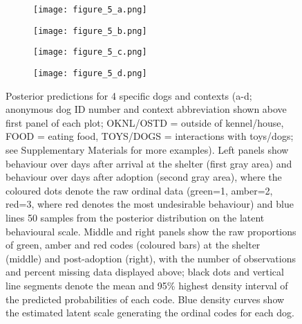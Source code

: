 \documentclass[12pt]{article}
\begin{document}
\begin{figure}[t!]
  \centering
  \begin{subfigure}{1\textwidth}
    \centering
    \texttt{[image: figure\_5\_a.png]}
  \end{subfigure}
  \begin{subfigure}{1\textwidth}
    \centering
    \vspace{-0.6cm}
    \texttt{[image: figure\_5\_b.png]}
  \end{subfigure}
  \begin{subfigure}{1\textwidth}
    \centering
    \vspace{-0.6cm}
    \texttt{[image: figure\_5\_c.png]}
  \end{subfigure}
  \begin{subfigure}{1\textwidth}
    \centering
    \vspace{-0.6cm}
    \texttt{[image: figure\_5\_d.png]}
  \end{subfigure}%
  \caption{\footnotesize{
  Posterior predictions for 4 specific dogs and contexts (a-d; anonymous dog ID number and context abbreviation shown above first panel of each plot; OKNL/OSTD = outside of kennel/house, FOOD = eating food, TOYS/DOGS = interactions with toys/dogs; see Supplementary Materials for more examples). Left panels show behaviour over days after arrival at the shelter (first gray area) and behaviour over days after adoption (second gray area), where the coloured dots denote the raw ordinal data (green=1, amber=2, red=3, where red denotes the most undesirable behaviour) and blue lines 50 samples from the posterior distribution on the latent behavioural scale. Middle and right panels show the raw proportions of green, amber and red codes (coloured bars) at the shelter (middle) and post-adoption (right), with the number of observations and percent missing data displayed above; black dots and vertical line segments denote the mean and 95\% highest density interval of the predicted probabilities of each code. Blue density curves show the estimated latent scale generating the ordinal codes for each dog.}
  }
  \label{fig_pps}
\end{figure}
\end{document}
